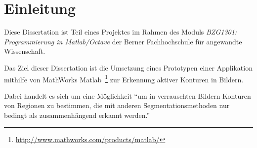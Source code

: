 \chapter{Einleitung}
\label{chap:intro}

Diese Dissertation ist Teil eines Projektes im Rahmen des Moduls \textit{BZG1301: Programmierung in Matlab/Octave} der Berner Fachhochschule für angewandte Wissenschaft.

Das Ziel dieser Dissertation ist die Umsetzung eines Prototypen einer Applikation mithilfe von MathWorks Matlab~\footnote{\url{http://www.mathworks.com/products/matlab/}} zur Erkennung \gls{aktiver Konturen} in Bildern.

Dabei handelt es sich um eine Möglichkeit ``um in verrauschten Bildern Konturen von Regionen zu bestimmen, die mit anderen \gls{Segmentationsmethoden} nur bedingt als zusammenhängend erkannt werden.''~\cite[S. 144]{hudritsch:script:cp}

%  
